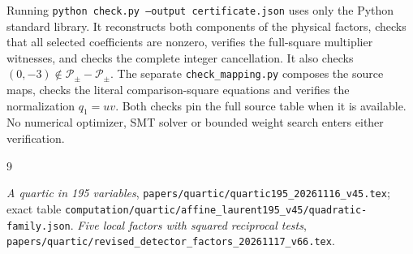 \documentclass[11pt,a4paper]{article}
\begin{document}
Running \texttt{python check.py --output certificate.json} uses
only the Python standard library. It reconstructs both components
of the physical factors, checks that all selected coefficients are
nonzero, verifies the full-square multiplier witnesses, and checks
the complete integer cancellation. It also checks
$(0,-3)\notin\mathcal P_\pm-\mathcal P_\pm$.
The separate \texttt{check\_mapping.py} composes the source maps,
checks the literal comparison-square equations and verifies the
normalization $q_1=uv$. Both checks pin the full source table when
it is available. No numerical optimizer, SMT solver or bounded
weight search enters either verification.

\begin{thebibliography}{9}\raggedright
{}\emph{A quartic in 195 variables},
\nolinkurl{papers/quartic/quartic195_20261116_v45.tex}; exact table
\nolinkurl{computation/quartic/affine_laurent195_v45/quadratic-family.json}.
\emph{Five local factors with squared reciprocal tests},
\nolinkurl{papers/quartic/revised_detector_factors_20261117_v66.tex}.
\end{thebibliography}
\end{document}
